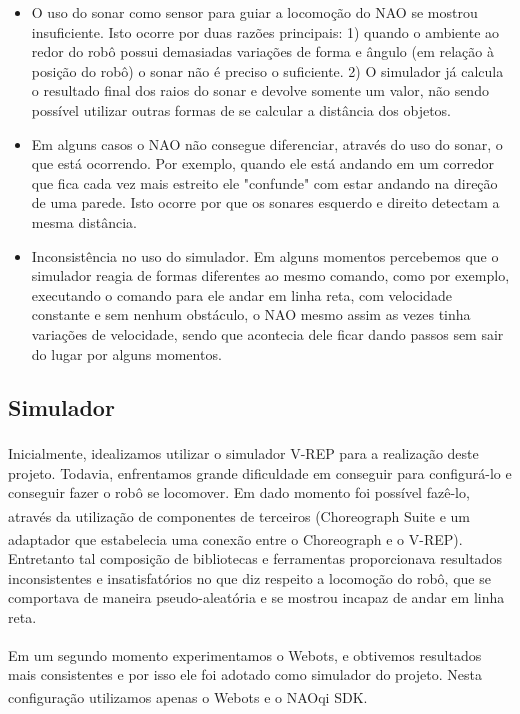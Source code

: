 \documentclass[twoside,conference,a4paper]{IEEEtran}
\begin{document}
\begin{itemize}
\item O uso do sonar como sensor para guiar a locomoção do NAO se mostrou insuficiente. Isto ocorre por duas razões principais: 1) quando o ambiente ao redor do robô possui demasiadas variações de forma e ângulo (em relação à posição do robô) o sonar não é preciso o suficiente. 2) O simulador já calcula o resultado final dos raios do sonar e devolve somente um valor, não sendo possível utilizar outras formas de se calcular a distância dos objetos.
\item Em alguns casos o NAO não consegue diferenciar, através do uso do sonar, o que está ocorrendo. Por exemplo, quando ele está andando em um corredor que fica cada vez mais estreito ele "confunde" com estar andando na direção de uma parede. Isto ocorre por que os sonares esquerdo e direito detectam a mesma distância.
\item Inconsistência no uso do simulador. Em alguns momentos percebemos que o simulador reagia de formas diferentes ao mesmo comando, como por exemplo, executando o comando para ele andar em linha reta, com velocidade constante e sem nenhum obstáculo, o NAO mesmo assim as vezes tinha variações de velocidade, sendo que acontecia dele ficar dando passos sem sair do lugar por alguns momentos.
\end{itemize}

\subsection{Simulador}
Inicialmente, idealizamos utilizar o simulador V-REP\textsuperscript{\textregistered} para a realização deste projeto. Todavia, enfrentamos grande dificuldade em conseguir para configurá-lo e conseguir fazer o robô se locomover. Em dado momento foi possível fazê-lo, através da utilização de componentes de terceiros (Choreograph Suite\textsuperscript{\textregistered} e um adaptador que estabelecia uma conexão entre o Choreograph\textsuperscript{\textregistered} e o V-REP\textsuperscript{\textregistered}). Entretanto tal composição de bibliotecas e ferramentas proporcionava resultados inconsistentes e insatisfatórios no que diz respeito a locomoção do robô, que se comportava de maneira pseudo-aleatória e se mostrou incapaz de andar em linha reta. 

Em um segundo momento experimentamos o Webots\textsuperscript{\textregistered}, e obtivemos resultados mais consistentes e por isso ele foi adotado como simulador do projeto. Nesta configuração utilizamos apenas o Webots\textsuperscript{\textregistered} e o NAOqi SDK.
\end{document}
